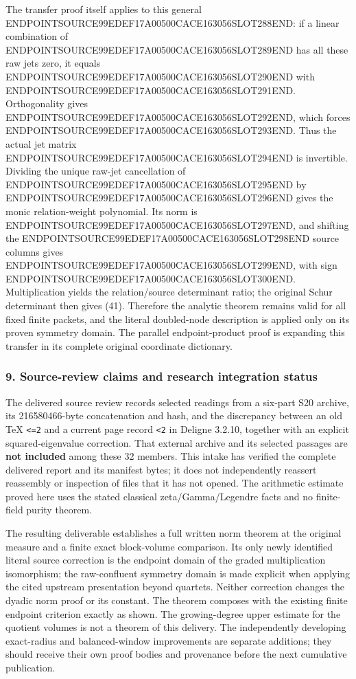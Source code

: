 The transfer proof itself applies to this general ENDPOINTSOURCE99EDEF17A00500CACE163056SLOT288END: if a linear combination of ENDPOINTSOURCE99EDEF17A00500CACE163056SLOT289END has all these raw jets zero, it equals ENDPOINTSOURCE99EDEF17A00500CACE163056SLOT290END with ENDPOINTSOURCE99EDEF17A00500CACE163056SLOT291END. Orthogonality gives ENDPOINTSOURCE99EDEF17A00500CACE163056SLOT292END, which forces ENDPOINTSOURCE99EDEF17A00500CACE163056SLOT293END. Thus the actual jet matrix ENDPOINTSOURCE99EDEF17A00500CACE163056SLOT294END is invertible. Dividing the unique raw-jet cancellation of ENDPOINTSOURCE99EDEF17A00500CACE163056SLOT295END by ENDPOINTSOURCE99EDEF17A00500CACE163056SLOT296END gives the monic relation-weight polynomial. Its norm is ENDPOINTSOURCE99EDEF17A00500CACE163056SLOT297END, and shifting the ENDPOINTSOURCE99EDEF17A00500CACE163056SLOT298END source columns gives ENDPOINTSOURCE99EDEF17A00500CACE163056SLOT299END, with sign ENDPOINTSOURCE99EDEF17A00500CACE163056SLOT300END. Multiplication yields the relation/source determinant ratio; the original Schur determinant then gives (41). Therefore the analytic theorem remains valid for all fixed finite packets, and the literal doubled-node description is applied only on its proven symmetry domain. The parallel endpoint-product proof is expanding this transfer in its complete original coordinate dictionary.

\subsubsection{9. Source-review claims and research integration status}\label{endpoint-arithmetic_intake--source-review-claims-and-research-integration-status}

The delivered source review records selected readings from a six-part S20 archive, its 216580466-byte concatenation and hash, and the discrepancy between an old TeX \texttt{\textless{}=2} and a current page record \texttt{\textless{}2} in Deligne 3.2.10, together with an explicit squared-eigenvalue correction. That external archive and its selected passages are \textbf{not included} among these 32 members. This intake has verified the complete delivered report and its manifest bytes; it does not independently reassert reassembly or inspection of files that it has not opened. The arithmetic estimate proved here uses the stated classical zeta/Gamma/Legendre facts and no finite-field purity theorem.

The resulting deliverable establishes a full written norm theorem at the original measure and a finite exact block-volume comparison. Its only newly identified literal source correction is the endpoint domain of the graded multiplication isomorphism; the raw-confluent symmetry domain is made explicit when applying the cited upstream presentation beyond quartets. Neither correction changes the dyadic norm proof or its constant. The theorem composes with the existing finite endpoint criterion exactly as shown. The growing-degree upper estimate for the quotient volumes is not a theorem of this delivery. The independently developing exact-radius and balanced-window improvements are separate additions; they should receive their own proof bodies and provenance before the next cumulative publication.

